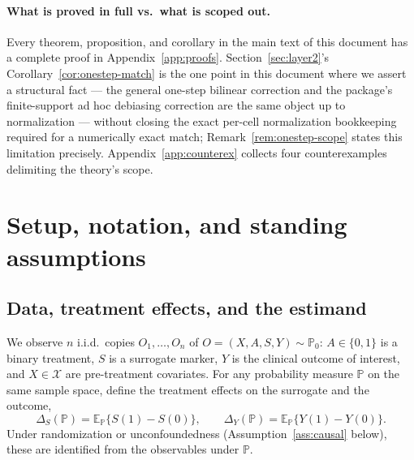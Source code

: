 \documentclass[11pt]{article}
\theoremstyle{plain}
\theoremstyle{definition}
\theoremstyle{remark}
\newcommand{\E}{\mathbb{E}}
\newcommand{\PP}{\mathbb{P}}
\newcommand{\cX}{\mathcal{X}}
\begin{document}
\paragraph{What is proved in full vs.\ what is scoped out.} Every theorem, proposition,
and corollary in the main text of this document has a complete proof in
Appendix~\ref{app:proofs}. Section~\ref{sec:layer2}'s Corollary~\ref{cor:onestep-match}
is the one point in this document where we assert a structural fact --- the general
one-step bilinear correction and the package's finite-support ad hoc debiasing
correction are the same object up to normalization --- without closing the exact
per-cell normalization bookkeeping required for a numerically exact match;
Remark~\ref{rem:onestep-scope} states this limitation precisely.
Appendix~\ref{app:counterex} collects four counterexamples delimiting the theory's
scope.

\section{Setup, notation, and standing assumptions}\label{sec:setup}

\subsection{Data, treatment effects, and the estimand}

We observe $n$ i.i.d.\ copies $O_1,\dots,O_n$ of $O=(X,A,S,Y)\sim\PP_0$: $A\in\{0,1\}$
is a binary treatment, $S$ is a surrogate marker, $Y$ is the clinical outcome of
interest, and $X\in\cX$ are pre-treatment covariates. For any probability measure $\PP$
on the same sample space, define the treatment effects on the surrogate and the
outcome,
\begin{equation}\label{eq:delta-def}
    \Delta_S(\PP) = \E_\PP\{S(1)-S(0)\}, \qquad \Delta_Y(\PP) = \E_\PP\{Y(1)-Y(0)\}.
\end{equation}
Under randomization or unconfoundedness (Assumption~\ref{ass:causal} below), these are
identified from the observables under $\PP$.
\end{document}
